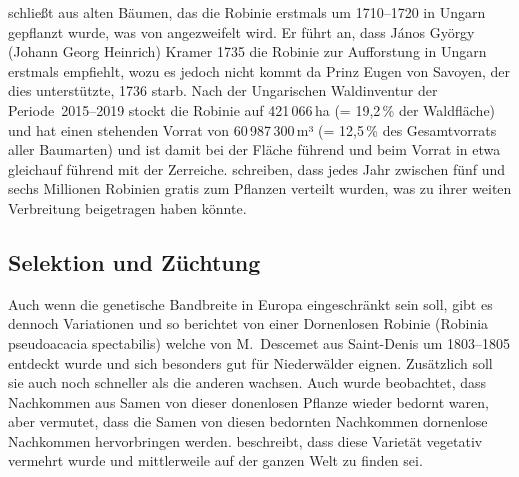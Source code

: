 \documentclass[twocolumn]{scrartcl}
\begin{document}
\citet[S.~3]{vadas1911robinie} schließt aus alten Bäumen, das
die Robinie erstmals um 1710--1720 in Ungarn gepflanzt wurde, was von
\citet[S.~179]{ernyey1926robinie} angezweifelt wird. Er führt an, dass
János György (Johann Georg Heinrich) Kramer 1735 die Robinie zur
Aufforstung in Ungarn erstmals empfiehlt, wozu es jedoch nicht kommt da
Prinz Eugen von Savoyen, der dies unterstützte, 1736 starb. Nach der
Ungarischen Waldinventur \citep{waldinventur20152019ungarn} der
Periode~2015--2019 stockt die Robinie auf
421\,066\,ha (= 19,2\,\% der Waldfläche) und hat einen stehenden Vorrat von
60\,987\,300\,m³ (= 12,5\,\% des Gesamtvorrats aller Baumarten) und ist
damit bei der Fläche führend und beim Vorrat in etwa gleichauf führend
mit der Zerreiche. \cite{bund1899robinie,gaskil1906robinie} schreiben,
dass jedes Jahr
zwischen fünf und sechs Millionen Robinien gratis zum Pflanzen verteilt wurden,
was zu ihrer weiten Verbreitung beigetragen haben könnte.

\subsection{Selektion und Züchtung}

Auch wenn die genetische Bandbreite in Europa eingeschränkt sein soll, gibt es
dennoch Variationen und so berichtet \citet[S.~259--260]{Michaux1813arbres} von
einer Dornenlosen Robinie (Robinia pseudoacacia spectabilis) welche von
M.~Descemet aus Saint-Denis um 1803--1805 entdeckt wurde und sich besonders gut
für Niederwälder eignen. Zusätzlich soll sie auch noch schneller als die anderen
wachsen. Auch wurde beobachtet, dass Nachkommen aus Samen von dieser donenlosen
Pflanze wieder bedornt waren, aber \citet{Michaux1813arbres} vermutet, dass die
Samen von diesen bedornten Nachkommen dornenlose Nachkommen hervorbringen
werden. \citet[S.~173]{quatrefages1861robinie} beschreibt, dass diese Varietät
vegetativ vermehrt wurde und mittlerweile auf der ganzen Welt zu finden sei.
\end{document}
